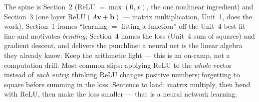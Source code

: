 \documentclass[10pt]{article}
\newcommand{\vv}{\mathbf{v}}
\newcommand{\bb}{\mathbf{b}}
\newcommand{\relu}{\mathrm{ReLU}}
\begin{document}
\begin{teachernote}
The spine is Section~2 (ReLU $=\max(0,x)$, the one nonlinear ingredient) and Section~3 (one layer
$\relu(A\vv+\bb)$ --- matrix multiplication, Unit~1, does the work). Section~1 frames ``learning $=$
fitting a function'' off the Unit~4 best-fit line and motivates \emph{bending}; Section~4 names the loss
(Unit~4 sum of squares) and gradient descent, and delivers the punchline: a neural net is the linear
algebra they already know. Keep the arithmetic light --- this is an on-ramp, not a computation drill.
Most common slips: applying ReLU to the \emph{whole} vector instead of \emph{each entry}; thinking ReLU
changes positive numbers; forgetting to square before summing in the loss. Sentence to land: matrix
multiply, then bend with ReLU, then make the loss smaller --- that is a neural network learning.
\end{teachernote}
\end{document}
